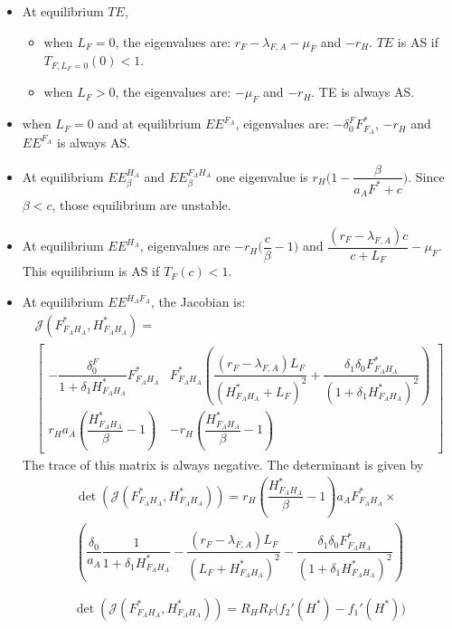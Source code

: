 \documentclass{article}
\newcommand{\lfa}{\lambda_{F, A}}
\newcommand{\df}{\delta_0^F}
\begin{document}
\begin{itemize}
\item At equilibrium $TE$,
\begin{itemize}
\item when $L_F = 0$, the eigenvalues are: $r_F - \lfa - \mu_F$ and $-r_H$. $TE$ is AS if $T_{F,L_F =0}(0) < 1$.
\item when $L_F > 0$, the eigenvalues are: $-\mu_F$ and $-r_H$. TE is always AS.
\end{itemize}
\item when $L_F = 0$ and at equilibrium $EE^{F_A}$, eigenvalues are: $-\df F_{F_A}^*$, $-r_H$ and $EE^{F_A}$ is always AS.
\item At equilibrium $EE^{H_A}_\beta$ and $EE^{F_AH_A}_\beta$ one eigenvalue is $r_H \Big(1 - \dfrac{\beta}{a_A F^* + c} \Big)$. Since $\beta < c$, those equilibrium are unstable.
\item At equilibrium $EE^{H_A}$, eigenvalues are $-r_H \Big(\dfrac{c}{\beta}-1 \Big)$ and $\dfrac{(r_F - \lfa) c}{c + L_F} - \mu_F$. This equilibrium is AS if $T_F(c) < 1$.

\item At equilibrium $EE^{H_AF_A}$, the Jacobian is:
\begin{multline}
\mathcal{J}(F^*_{F_AH_A}, H^*_{F_AH_A}) = \\ \begin{bmatrix}
- \dfrac{\df}{1 + \delta_1 H^*_{F_AH_A}}F^*_{F_AH_A} & F^*_{F_AH_A} \left( \dfrac{(r_F - \lfa)L_F}{(H^*_{F_AH_A} + L_F)^2} + \dfrac{\delta_1 \delta_0F^*_{F_AH_A}}{(1 + \delta_1 H^*_{F_AH_A})^2} \right) \\
r_H a_A (\dfrac{H^*_{F_AH_A}}{\beta} - 1) & -r_H(\dfrac{H^*_{F_AH_A}}{\beta} - 1)
\end{bmatrix}
\end{multline}
The trace of this matrix is always negative. The determinant is given by
\begin{multline}
\det(\mathcal{J}(F^*_{F_AH_A}, H^*_{F_AH_A})) = r_H \left(\dfrac{H^*_{F_AH_A}}{\beta} - 1 \right) a_A F^*_{F_AH_A} \times \\\left(\dfrac{\delta_0}{a_A} \dfrac{1}{1 + \delta_1 H^*_{F_AH_A}} - \dfrac{(r_F-\lfa) L_F}{(L_F + H^*_{F_AH_A})^2} - \dfrac{\delta_1 \delta_0 F^*_{F_AH_A}}{(1+ \delta_1H^*_{F_AH_A})^2}\right)
\end{multline}

\begin{equation}
\det(\mathcal{J}(F^*_{F_AH_A}, H^*_{F_AH_A})) = R_H R_F \Big( f_2'(H^*) - f_1'(H^*) \Big)
\end{equation}
\end{itemize}
\end{document}
